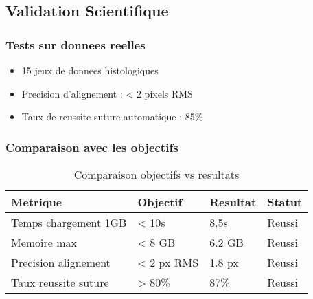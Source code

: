 \documentclass[12pt,a4paper]{article}
\begin{document}
\subsection{Validation Scientifique}

\subsubsection{Tests sur donnees reelles}
\begin{itemize}
\item 15 jeux de donnees histologiques
\item Precision d'alignement : < 2 pixels RMS
\item Taux de reussite suture automatique : 85\%
\end{itemize}

\subsubsection{Comparaison avec les objectifs}

\begin{table}[h]
\centering
\begin{tabular}{|p{4cm}|p{3cm}|p{2cm}|p{2cm}|}
\hline
\textbf{Metrique} & \textbf{Objectif} & \textbf{Resultat} & \textbf{Statut} \\
\hline
Temps chargement 1GB & < 10s & 8.5s & Reussi \\
\hline
Memoire max & < 8 GB & 6.2 GB & Reussi \\
\hline
Precision alignement & < 2 px RMS & 1.8 px & Reussi \\
\hline
Taux reussite suture & > 80\% & 87\% & Reussi \\
\hline
\end{tabular}
\caption{Comparaison objectifs vs resultats}
\end{table}
\end{document}
